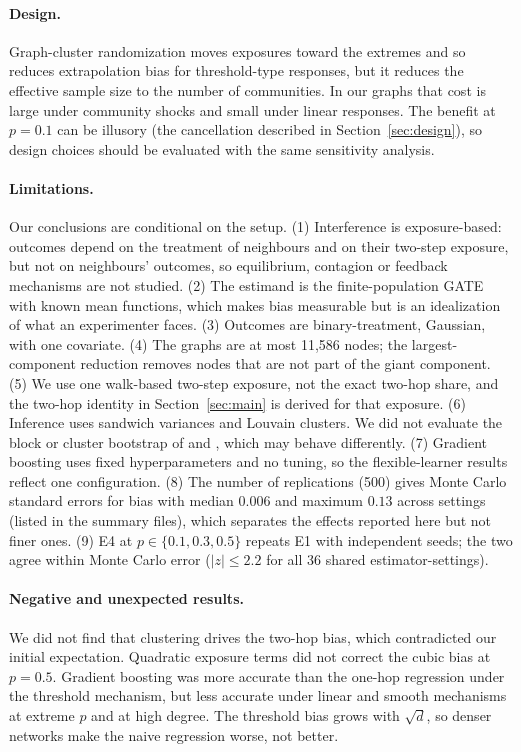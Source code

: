 \documentclass{article}
\begin{document}
\paragraph{Design.} Graph-cluster randomization moves exposures toward the extremes and so reduces extrapolation bias for threshold-type responses, but it reduces the effective sample size to the number of communities. In our graphs that cost is large under community shocks and small under linear responses. The benefit at $p=0.1$ can be illusory (the cancellation described in Section~\ref{sec:design}), so design choices should be evaluated with the same sensitivity analysis.

\paragraph{Limitations.} Our conclusions are conditional on the setup. (1) Interference is exposure-based: outcomes depend on the treatment of neighbours and on their two-step exposure, but not on neighbours' outcomes, so equilibrium, contagion or feedback mechanisms are not studied. (2) The estimand is the finite-population GATE with known mean functions, which makes bias measurable but is an idealization of what an experimenter faces. (3) Outcomes are binary-treatment, Gaussian, with one covariate. (4) The graphs are at most 11{,}586 nodes; the largest-component reduction removes nodes that are not part of the giant component. (5) We use one walk-based two-step exposure, not the exact two-hop share, and the two-hop identity in Section~\ref{sec:main} is derived for that exposure. (6) Inference uses sandwich variances and Louvain clusters. We did not evaluate the block or cluster bootstrap of \citet{chin2019} and \citet{han2023}, which may behave differently. (7) Gradient boosting uses fixed hyperparameters and no tuning, so the flexible-learner results reflect one configuration. (8) The number of replications (500) gives Monte Carlo standard errors for bias with median $0.006$ and maximum $0.13$ across settings (listed in the summary files), which separates the effects reported here but not finer ones. (9) E4 at $p\in\{0.1,0.3,0.5\}$ repeats E1 with independent seeds; the two agree within Monte Carlo error ($|z|\le 2.2$ for all 36 shared estimator-settings).

\paragraph{Negative and unexpected results.} We did not find that clustering drives the two-hop bias, which contradicted our initial expectation. Quadratic exposure terms did not correct the cubic bias at $p=0.5$. Gradient boosting was more accurate than the one-hop regression under the threshold mechanism, but less accurate under linear and smooth mechanisms at extreme $p$ and at high degree. The threshold bias grows with $\sqrt d$, so denser networks make the naive regression worse, not better.
\end{document}
